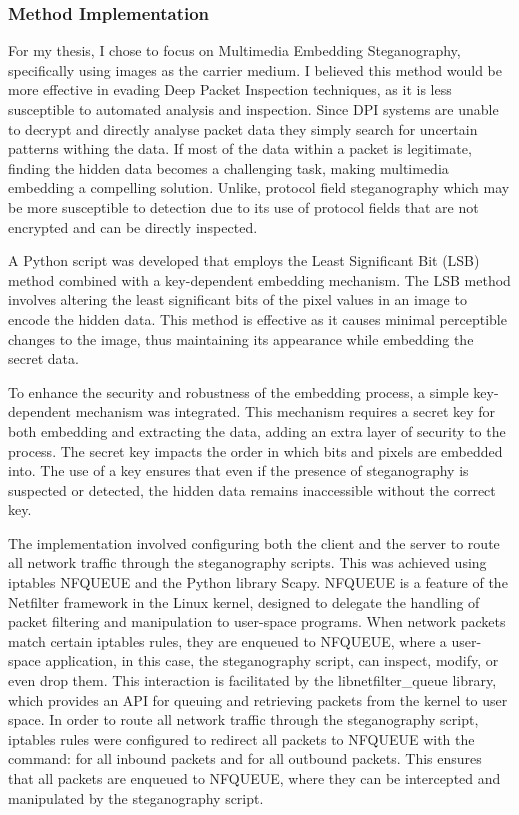 \documentclass[12pt, fleqn, a4paper]{article}
\begin{document}
\subsubsection{Method Implementation}
For my thesis, I chose to focus on Multimedia Embedding Steganography, specifically using images as the carrier medium. I believed this method would be more effective in evading Deep Packet Inspection techniques, as it is less susceptible to automated analysis and inspection. Since DPI systems are unable to decrypt and directly analyse packet data they simply search for uncertain patterns withing the data. If most of the data within a packet is legitimate, finding the hidden data becomes a challenging task, making multimedia embedding a compelling solution. Unlike, protocol field steganography which may be more susceptible to detection due to its use of protocol fields that are not encrypted and can be directly inspected.

A Python script was developed that employs the Least Significant Bit (LSB) method combined with a key-dependent embedding mechanism. The LSB method involves altering the least significant bits of the pixel values in an image to encode the hidden data. This method is effective as it causes minimal perceptible changes to the image, thus maintaining its appearance while embedding the secret data.

To enhance the security and robustness of the embedding process, a simple key-dependent mechanism was integrated. This mechanism requires a secret key for both embedding and extracting the data, adding an extra layer of security to the process. The secret key impacts the order in which bits and pixels are embedded into. The use of a key ensures that even if the presence of steganography is suspected or detected, the hidden data remains inaccessible without the correct key. \citep{stegokey}

The implementation involved configuring both the client and the server to route all network traffic through the steganography scripts. This was achieved using iptables NFQUEUE and the Python library Scapy. NFQUEUE is a feature of the Netfilter framework in the Linux kernel, designed to delegate the handling of packet filtering and manipulation to user-space programs. When network packets match certain iptables rules, they are enqueued to NFQUEUE, where a user-space application, in this case, the steganography script, can inspect, modify, or even drop them. This interaction is facilitated by the libnetfilter\_queue library, which provides an API for queuing and retrieving packets from the kernel to user space. In order to route all network traffic through the steganography script, iptables rules were configured to redirect all packets to NFQUEUE with the command:  for all inbound packets and  for all outbound packets. This ensures that all packets are enqueued to NFQUEUE, where they can be intercepted and manipulated by the steganography script.
\end{document}
